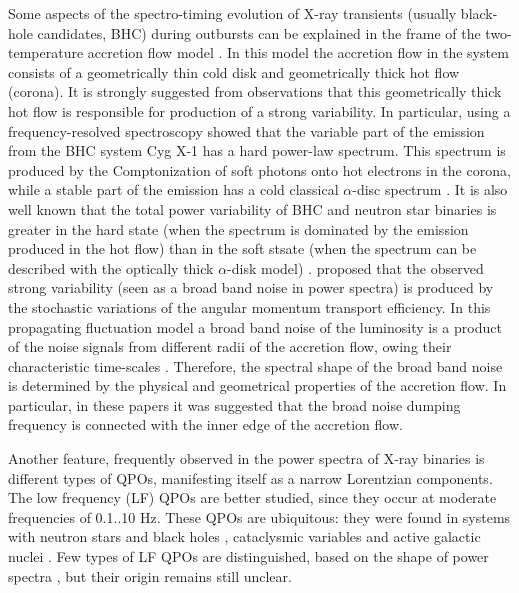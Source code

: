\documentclass[a4paper,fleqn,usenatbib]{mnras}
\begin{document}
Some aspects of the spectro-timing evolution of X-ray transients (usually black-hole candidates, BHC) during outbursts can be explained in the frame of the two-temperature accretion flow model \citep{1975ApJ...199L.153E, 1976ApJ...204..187S, 1995ApJ...452..710N}. In this model the accretion flow in the system consists of a geometrically thin cold disk and geometrically thick hot flow (corona). 
It is strongly suggested from observations that this geometrically thick hot flow is responsible for production of a strong variability. 
In particular, using a frequency-resolved spectroscopy \citet{2001MNRAS.321..759C} showed that the variable part of the emission from the BHC system Cyg X-1 has a hard power-law spectrum. 
This spectrum is produced by the Comptonization of soft photons onto hot electrons in the corona, while a stable part of the emission has a cold classical $\alpha$-disc spectrum \citep{shakura73}.  
It is also well known that the total power variability of BHC and neutron star binaries is greater in the hard state (when the spectrum is dominated by the emission produced in the hot flow) than in the soft stsate (when the spectrum can be described with the optically thick $\alpha$-disk model) \citep[][e.t.c.]{1992ApJ...391L..21M, 2000A&A...363.1013R, 2001ApJS..132..377H, 2001MNRAS.321..759C}. 
\citet{1997MNRAS.292..679L} proposed that the observed strong variability (seen as a broad band noise in power spectra) is produced by the stochastic variations of the angular momentum transport efficiency. 
In this propagating fluctuation model a broad band noise of the luminosity is a product of the noise signals from different radii of the accretion flow, owing their characteristic time-scales \citep[see, e.g.,][]{2006MNRAS.367..801A, 2013MNRAS.434.1476I}. 
Therefore, the spectral shape of the broad band noise is determined by the physical and geometrical properties of the accretion flow. In particular, in these papers it was suggested that the broad noise dumping frequency is connected with the inner edge of the accretion flow. 

Another feature, frequently observed in the power spectra of X-ray binaries is different types of QPOs, manifesting itself as a narrow Lorentzian components. 
The low frequency (LF) QPOs are better studied, since they occur at moderate frequencies of 0.1..10 Hz. 
These QPOs are ubiquitous: they were found in systems with neutron stars and black holes \citep{wijnands99}, cataclysmic variables \citep{mauche02} and active galactic nuclei \citep{gierlinskiy08}. 
Few types of LF QPOs are distinguished, based on the shape of power spectra \citep[see, e.g.][]{casella05}, but their origin remains still unclear.
\end{document}

